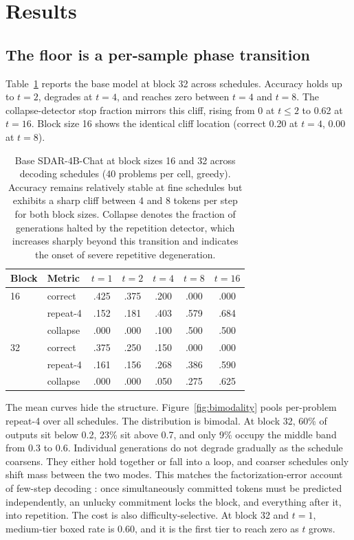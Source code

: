 \documentclass{article}
\begin{document}
\section{Results}
\label{sec:results}

\subsection{The floor is a per-sample phase transition}
\label{sec:floor}

Table~\ref{tab:base} reports the base model at block 32 across schedules. Accuracy holds up to $t=2$, degrades at $t=4$, and reaches zero between $t=4$ and $t=8$. The collapse-detector stop fraction mirrors this cliff, rising from 0 at $t\le 2$ to 0.62 at $t=16$. Block size 16 shows the identical cliff location (correct 0.20 at $t=4$, 0.00 at $t=8$).

\begin{table}[H]
  \caption{Base SDAR-4B-Chat at block sizes 16 and 32 across decoding schedules (40 problems per cell, greedy). Accuracy remains relatively stable at fine schedules but exhibits a sharp cliff between 4 and 8 tokens per step for both block sizes. Collapse denotes the fraction of generations halted by the repetition detector, which increases sharply beyond this transition and indicates the onset of severe repetitive degeneration.}
  \label{tab:base}
  \centering
  \small
  \begin{tabular}{llccccc}
    \toprule
    Block & Metric & $t{=}1$ & $t{=}2$ & $t{=}4$ & $t{=}8$ & $t{=}16$ \\
    \midrule
    16 & correct  & .425 & .375 & .200 & .000 & .000 \\
       & repeat-4 & .152 & .181 & .403 & .579 & .684 \\
       & collapse & .000 & .000 & .100 & .500 & .500 \\
    \midrule
    32 & correct  & .375 & .250 & .150 & .000 & .000 \\
       & repeat-4 & .161 & .156 & .268 & .386 & .590 \\
       & collapse & .000 & .000 & .050 & .275 & .625 \\
    \bottomrule
  \end{tabular}
\end{table}

The mean curves hide the structure. Figure~\ref{fig:bimodality} pools per-problem repeat-4 over all schedules. The distribution is bimodal. At block 32, 60\% of outputs sit below 0.2, 23\% sit above 0.7, and only 9\% occupy the middle band from 0.3 to 0.6. Individual generations do not degrade gradually as the schedule coarsens. They either hold together or fall into a loop, and coarser schedules only shift mass between the two modes. This matches the factorization-error account of few-step decoding \citep{zhang2026t3d}: once simultaneously committed tokens must be predicted independently, an unlucky commitment locks the block, and everything after it, into repetition. The cost is also difficulty-selective. At block 32 and $t=1$, medium-tier boxed rate is 0.60, and it is the first tier to reach zero as $t$ grows.
\end{document}
